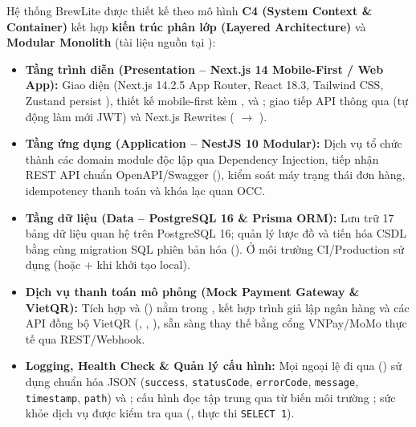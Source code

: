 \documentclass[12pt,a4paper]{report}
\begin{document}
Hệ thống BrewLite được thiết kế theo mô hình \textbf{C4 (System Context \& Container)} kết hợp \textbf{kiến trúc phân lớp (Layered Architecture)} và \textbf{Modular Monolith} (tài liệu nguồn tại ):
\begin{itemize}[leftmargin=*]
\item \textbf{Tầng trình diễn (Presentation -- Next.js 14 Mobile-First / Web App):} Giao diện  (Next.js 14.2.5 App Router, React 18.3, Tailwind CSS, Zustand persist ), thiết kế mobile-first kèm ,  và ; giao tiếp API thông qua  (tự động làm mới JWT) và Next.js Rewrites ( $\rightarrow$ ).
\item \textbf{Tầng ứng dụng (Application -- NestJS 10 Modular):} Dịch vụ  tổ chức thành các domain module độc lập qua Dependency Injection, tiếp nhận REST API chuẩn OpenAPI/Swagger (), kiểm soát máy trạng thái đơn hàng, idempotency thanh toán và khóa lạc quan OCC.
\item \textbf{Tầng dữ liệu (Data -- PostgreSQL 16 \& Prisma ORM):} Lưu trữ 17 bảng dữ liệu quan hệ trên PostgreSQL 16; quản lý lược đồ và tiến hóa CSDL bằng  cùng migration SQL phiên bản hóa (). Ở môi trường CI/Production sử dụng  (hoặc  +  khi khởi tạo local).
\item \textbf{Dịch vụ thanh toán mô phỏng (Mock Payment Gateway \& VietQR):} Tích hợp  và  () nằm trong , kết hợp trình giả lập ngân hàng  và các API đồng bộ VietQR (, , ), sẵn sàng thay thế bằng cổng VNPay/MoMo thực tế qua REST/Webhook.
\item \textbf{Logging, Health Check \& Quản lý cấu hình:} Mọi ngoại lệ đi qua  () sử dụng  chuẩn hóa JSON (\texttt{success}, \texttt{statusCode}, \texttt{errorCode}, \texttt{message}, \texttt{timestamp}, \texttt{path}) và ; cấu hình đọc tập trung qua  từ biến môi trường ; sức khỏe dịch vụ được kiểm tra qua  (,  thực thi \texttt{SELECT 1}).
\end{itemize}
\end{document}
